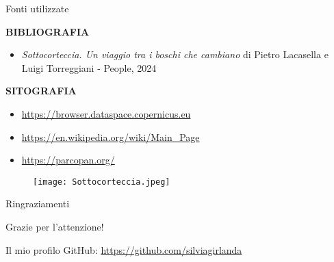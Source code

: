 \documentclass{beamer} %
\begin{document}
 \begin{frame}{Fonti utilizzate}
 \begin{multicols}{2}
 \textbf{BIBLIOGRAFIA}
 \begin{itemize}
     \item \textit{Sottocorteccia. Un viaggio tra i boschi che cambiano} di 
Pietro Lacasella e Luigi Torreggiani - People, 2024
 \end{itemize}
\bigskip
 \textbf{SITOGRAFIA}
            \begin{itemize}
                \item \url{https://browser.dataspace.copernicus.eu} \\
                \item \url{https://en.wikipedia.org/wiki/Main_Page} \\
                \item \url{https://parcopan.org/} \\
            \end{itemize}  
\columnbreak
\begin{figure}
    \centering
    \texttt{[image: Sottocorteccia.jpeg]}
\end{figure}
\end{multicols}
        \end{frame}
        
\begin{frame}{Ringraziamenti}
            \begin{center}
                {\huge Grazie per l'attenzione!}\\
                \bigskip
                \bigskip
                \bigskip
                \bigskip
                \bigskip
                \bigskip
                \bigskip
                \bigskip
            \end{center}
        Il mio profilo GitHub: \url{https://github.com/silviagirlanda} \end{frame}
\end{document}
